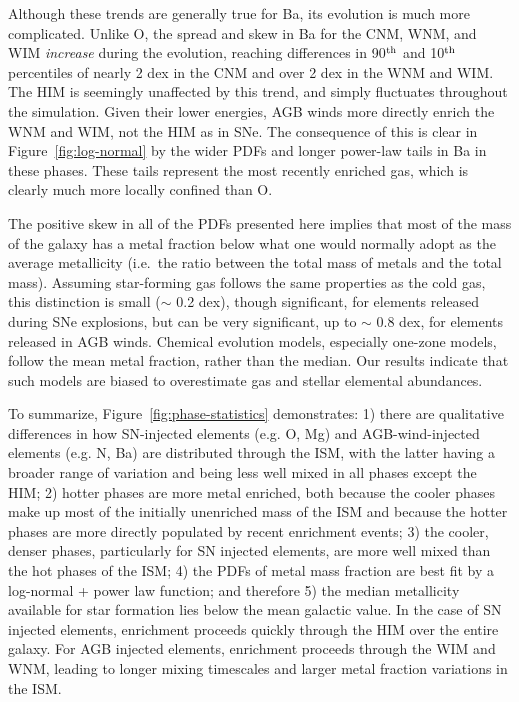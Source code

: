 
Although these trends are generally true for Ba, its evolution is much more complicated.
Unlike O, the spread and skew in Ba for the CNM, WNM, and WIM \textit{increase} during the evolution, reaching differences in 90$^{\rm th}$ and 10$^{\rm th}$ percentiles of nearly 2 dex in the CNM and over 2 dex in the WNM and WIM. The HIM is seemingly unaffected by this trend, and simply fluctuates throughout the simulation. Given their lower energies, AGB winds more directly enrich the WNM and WIM, not the HIM as in SNe. The consequence of this is clear in Figure~\ref{fig:log-normal} by the wider PDFs and longer power-law tails in Ba in these phases. These tails represent the most recently enriched gas, 
        which
is clearly much more locally confined than O.

The positive skew in all of the PDFs presented here implies that most of the mass of the galaxy has a metal fraction below what one would normally adopt as the average metallicity (i.e.\ the ratio between the total mass of metals and the total mass). Assuming star-forming gas follows the same properties as the cold gas, this distinction is small ($\sim$ 0.2 dex), 
   though 
significant, for elements released during SNe explosions, but can be very significant, up to $\sim$ 0.8 dex, for elements released in AGB winds. Chemical evolution models, especially one-zone models, follow the mean metal fraction, rather than the median. 
            Our results indicate that such
models are biased to overestimate gas and stellar elemental abundances.

To summarize, Figure~\ref{fig:phase-statistics} demonstrates: 1) there are qualitative differences in how SN-injected elements (e.g. O, Mg) and AGB-wind-injected elements (e.g. N, Ba) are distributed through the ISM, with the latter having a broader range of variation and being less well mixed in all phases except the HIM; 2) hotter phases are more metal enriched, both because the cooler phases make up most of the initially unenriched mass of the ISM and because the hotter phases are more directly populated by recent enrichment events; 3) the cooler, denser phases, particularly for SN injected elements, are more well mixed than the hot phases of the ISM; 4) the PDFs of metal mass fraction are best fit by a log-normal + power law function; and therefore 5) the median metallicity available for star formation 
lies below the mean galactic value. In the case of SN injected elements, enrichment proceeds quickly through the HIM over the entire galaxy. For AGB injected elements, enrichment proceeds through the WIM and WNM, leading to longer mixing timescales and larger metal fraction variations in the ISM.

